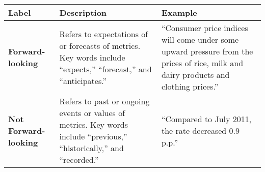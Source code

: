 \begin{table*}
    \caption{}
    \vspace{1em}
    \begin{tabular}{p{} p{} p{}}
    \toprule
    \textbf{Label} & \textbf{Description} & \textbf{Example} \\
    \midrule
    \textbf{Forward-looking} & Refers to expectations of or forecasts of metrics. Key words include ``expects,'' ``forecast,'' and ``anticipates.'' & ``Consumer price indices will come under some upward pressure from the prices of rice, milk and dairy products and clothing prices.'' \\
    \midrule
    \textbf{Not Forward-looking} & Refers to past or ongoing events or values of metrics. Key words include ``previous,'' ``historically,'' and ``recorded.'' & ``Compared to July 2011, the rate decreased 0.9 p.p.'' \\
    \bottomrule
    \end{tabular}
    \label{tb:bcb_forward_looking_guide}
    \end{table*}